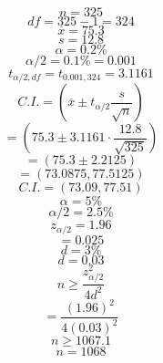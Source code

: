 \documentclass{article}
\begin{document}
    $$n=325$$
$$df = 325-1 = 324$$
$$\overline{x} = 75.3$$
$$s = 12.8$$
$$\alpha = 0.2\%$$
$$\alpha/2 = 0.1\% = 0.001$$
$$t_{\alpha/2, df} = t_{0.001, 324} = 3.1161$$
$$C.I. = \left( \overline{x} \pm t_{\alpha/2} \frac{s}{\sqrt{n}} \right)$$
$$= \left( 75.3 \pm 3.1161 \cdot \frac{12.8}{\sqrt{325}} \right)$$
$$= (75.3 \pm 2.2125)$$
$$= (73.0875, 77.5125)$$
$$C.I. = (73.09, 77.51)$$
$$\alpha = 5\%$$
$$\alpha/2 = 2.5\%$$
$$z_{\alpha/2} = 1.96$$
$$= 0.025$$
$$d = 3\%$$
$$d = 0.03$$
$$n \ge \frac{z_{\alpha/2}^2}{4d^2}$$
$$= \frac{(1.96)^2}{4(0.03)^2}$$
$$n \ge 1067.1$$
$$n = 1068$$

    
\end{document}
